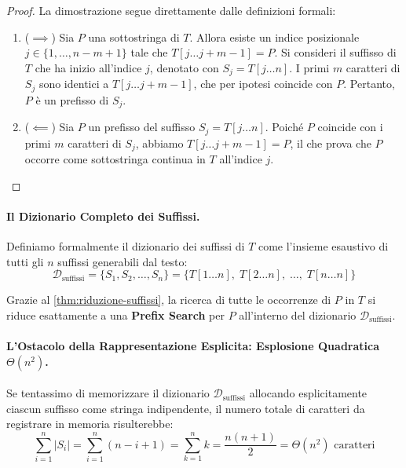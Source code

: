 \begin{proof}
La dimostrazione segue direttamente dalle definizioni formali:
\begin{enumerate}
  \item ($\implies$) Sia $P$ una sottostringa di $T$. Allora esiste un indice posizionale $j \in \{1, \dots, n - m + 1\}$ tale che $T[j \dots j + m - 1] = P$. Si consideri il suffisso di $T$ che ha inizio all'indice $j$, denotato con $S_j = T[j \dots n]$. I primi $m$ caratteri di $S_j$ sono identici a $T[j \dots j + m - 1]$, che per ipotesi coincide con $P$. Pertanto, $P$ \`e un prefisso di $S_j$.
  \item ($\impliedby$) Sia $P$ un prefisso del suffisso $S_j = T[j \dots n]$. Poich\'e $P$ coincide con i primi $m$ caratteri di $S_j$, abbiamo $T[j \dots j + m - 1] = P$, il che prova che $P$ occorre come sottostringa continua in $T$ all'indice $j$.
\end{enumerate}
\end{proof}

\paragraph{Il Dizionario Completo dei Suffissi.}
Definiamo formalmente il dizionario dei suffissi di $T$ come l'insieme esaustivo di tutti gli $n$ suffissi generabili dal testo:
\begin{equation}
  \mathcal{D}_{\text{suffissi}} = \{S_1, S_2, \dots, S_n\} = \{T[1 \dots n], \; T[2 \dots n], \; \dots, \; T[n \dots n]\}
\end{equation}

Grazie al \autoref{thm:riduzione-suffissi}, la ricerca di tutte le occorrenze di $P$ in $T$ si riduce esattamente a una \textbf{Prefix Search} per $P$ all'interno del dizionario $\mathcal{D}_{\text{suffissi}}$.

\paragraph{L'Ostacolo della Rappresentazione Esplicita: Esplosione Quadratica $\Theta(n^2)$.}
Se tentassimo di memorizzare il dizionario $\mathcal{D}_{\text{suffissi}}$ allocando esplicitamente ciascun suffisso come stringa indipendente, il numero totale di caratteri da registrare in memoria risulterebbe:
\begin{equation}
  \sum_{i=1}^n |S_i| = \sum_{i=1}^n (n - i + 1) = \sum_{k=1}^n k = \frac{n(n + 1)}{2} = \Theta(n^2) \text{ caratteri}
\end{equation}

